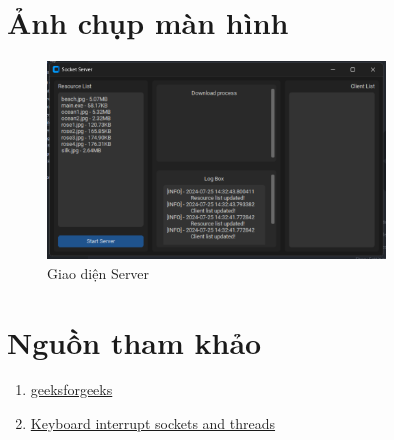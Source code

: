 \documentclass[a4paper,12pt]{report}
\begin{document}
\pagebreak
\section{Ảnh chụp màn hình}
\begin{figure}[ht]
  \centering
  \includegraphics[width=0.8\textwidth]{Screenshots/server-gui.png}
  \caption{Giao diện Server}\label{fig:server-gui}
\end{figure}

\pagebreak
\section{Nguồn tham khảo}
\begin{enumerate}
  \item \href{https://www.geeksforgeeks.org/}{geeksforgeeks}
  \item \href{https://stackoverflow.com/questions/47847392/keyboard-interrupt-sockets-and-threads}{Keyboard interrupt sockets and threads}
\end{enumerate}
\end{document}
